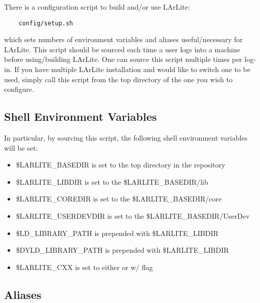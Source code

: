 
There is a configuration script to build and/or use LArLite:

\begin{lstlisting}
    config/setup.sh
\end{lstlisting}
which sets numbers of environment variables and aliases useful/necessary for LArLite.
This script should be sourced each time a user logs into a machine before using/building LArLite.
One can source this script multiple times per log-in.
If you have multiple LArLite installation and would like to switch one to be used, simply call
this script from the top directory of the one you wish to configure.

\subsection{Shell Environment Variables}

In particular, by sourcing this script, the following shell environment variables will be set:
\begin{itemize}
  \item {\ttfamily \$LARLITE\_BASEDIR} is set to the top directory in the repository
  \item {\ttfamily \$LARLITE\_LIBDIR} is set to the {\ttfamily \$LARLITE\_BASEDIR/lib}
  \item {\ttfamily \$LARLITE\_COREDIR} is set to the {\ttfamily \$LARLITE\_BASEDIR/core}
  \item {\ttfamily \$LARLITE\_USERDEVDIR} is set to the {\ttfamily \$LARLITE\_BASEDIR/UserDev}
  \item {\ttfamily \$LD\_LIBRARY\_PATH} is prepended with {\ttfamily \$LARLITE\_LIBDIR}
  \item {\ttfamily \$DYLD\_LIBRARY\_PATH} is prepended with {\ttfamily \$LARLITE\_LIBDIR}
  \item {\ttfamily \$LARLITE\_CXX} is set to either \clang or \gpp w/  flag
\end{itemize}

\subsection{Aliases}

